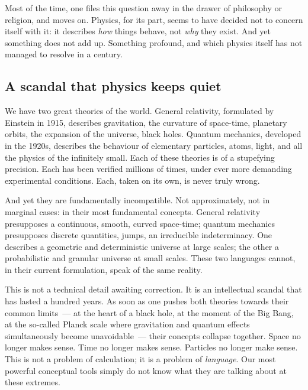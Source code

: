 \documentclass[12pt, a4paper, openright]{book}
\begin{document}
\medskip

Most of the time, one files this question away in the drawer of philosophy or religion, and moves on. Physics, for its part, seems to have decided not to concern itself with it: it describes \emph{how} things behave, not \emph{why} they exist. And yet something does not add up. Something profound, and which physics itself has not managed to resolve in a century.

\subsection*{A scandal that physics keeps quiet}

We have two great theories of the world. General relativity, formulated by Einstein in 1915, describes gravitation, the curvature of space-time, planetary orbits, the expansion of the universe, black holes. Quantum mechanics, developed in the 1920s, describes the behaviour of elementary particles, atoms, light, and all the physics of the infinitely small. Each of these theories is of a stupefying precision. Each has been verified millions of times, under ever more demanding experimental conditions. Each, taken on its own, is never truly wrong.

\medskip

And yet they are fundamentally incompatible. Not approximately, not in marginal cases: in their most fundamental concepts. General relativity presupposes a continuous, smooth, curved space-time; quantum mechanics presupposes discrete quantities, jumps, an irreducible indeterminacy. One describes a geometric and deterministic universe at large scales; the other a probabilistic and granular universe at small scales. These two languages cannot, in their current formulation, speak of the same reality.

\medskip

This is not a technical detail awaiting correction. It is an intellectual scandal that has lasted a hundred years. As soon as one pushes both theories towards their common limits~--- at the heart of a black hole, at the moment of the Big Bang, at the so-called Planck scale where gravitation and quantum effects simultaneously become unavoidable~--- their concepts collapse together. Space no longer makes sense. Time no longer makes sense. Particles no longer make sense. This is not a problem of calculation; it is a problem of \emph{language}. Our most powerful conceptual tools simply do not know what they are talking about at these extremes.
\end{document}
